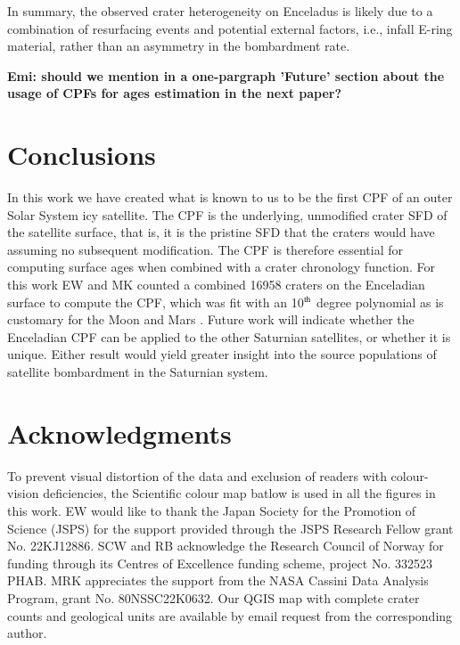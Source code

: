 \documentclass[preprint,12pt,3p,times,authoryear]{elsarticle}
\begin{document}
{In summary, the observed crater heterogeneity on Enceladus is likely due to a combination of resurfacing events and potential external factors, i.e., infall E-ring material, rather than an asymmetry in the bombardment rate.

\textbf{Emi: should we mention in a one-pargraph 'Future' section about the usage of CPFs for ages
estimation in the next paper? }

\section{Conclusions}
\label{sect:conclusion}
In this work we have created what is known to us to be the first CPF of an outer Solar System icy satellite. The CPF is the underlying, unmodified crater SFD of the satellite surface, that is, it is the pristine SFD that the craters would have assuming no subsequent modification. The CPF is therefore essential for computing surface ages when combined with a crater chronology function.
For this work EW and MK counted a combined 16958 craters on the Enceladian surface to compute the CPF, which was fit with an 10$^{\rm th}$ degree polynomial as is customary for the Moon and Mars \citep{Neukum1975, Neukum2001,Ivanov2001}. Future work will indicate whether the Enceladian CPF can be applied to the other Saturnian satellites, or whether it is unique. Either result would yield greater insight into the source populations of satellite bombardment in the Saturnian system.

\section*{Acknowledgments}
To prevent visual distortion of the data and exclusion of readers with colour-vision deficiencies, the Scientific colour map batlow \citet{Crameri2020} is used in all the figures in this work. EW would like to thank the Japan Society for the Promotion of Science (JSPS) for the support provided through the JSPS Research Fellow grant No. 22KJ12886. SCW and RB acknowledge the Research Council of Norway for funding through its Centres of Excellence funding scheme, project No. 332523 PHAB. MRK appreciates the support from the NASA Cassini Data Analysis Program, grant No. 80NSSC22K0632. Our QGIS map with complete crater counts and geological units are available by email request from the corresponding author.\\



{}
\pagebreak

}
\end{document}
